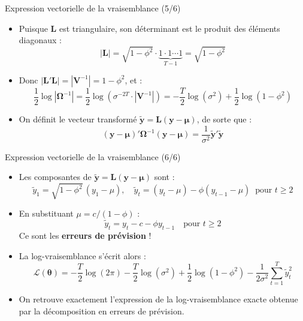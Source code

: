 \documentclass[11pt,aspectratio=169]{beamer}
\begin{document}
\begin{frame}{Expression vectorielle de la vraisemblance (5/6)}

\begin{itemize}

\item Puisque $\mathbf{L}$ est triangulaire, son déterminant est le produit des éléments diagonaux :
  \[
  |\mathbf{L}| = \sqrt{1-\phi^2} \cdot \underbrace{1 \cdot 1 \cdots 1}_{T-1} = \sqrt{1-\phi^2}
  \]\newline

\item Donc $|\mathbf{L}'\mathbf{L}| = |\mathbf{V}^{-1}| = 1 - \phi^2$, et :
  \[
  \frac{1}{2}\log|\bm{\Omega}^{-1}| = \frac{1}{2}\log(\sigma^{-2T} \cdot |\mathbf{V}^{-1}|) = -\frac{T}{2}\log(\sigma^2) + \frac{1}{2}\log(1 - \phi^2)
  \]\newline

\item On définit le vecteur transformé $\tilde{\mathbf{y}} = \mathbf{L}(\mathbf{y} - \bm{\mu})$, de sorte que :
  \[
  (\mathbf{y} - \bm{\mu})'\bm{\Omega}^{-1}(\mathbf{y} - \bm{\mu}) = \frac{1}{\sigma^2}\tilde{\mathbf{y}}'\tilde{\mathbf{y}}
  \]

\end{itemize}

\end{frame}

\begin{frame}{Expression vectorielle de la vraisemblance (6/6)}

\begin{itemize}

\item Les composantes de $\tilde{\mathbf{y}} = \mathbf{L}(\mathbf{y} - \bm{\mu})$ sont :
  \[
  \tilde{y}_1 = \sqrt{1-\phi^2}\,(y_1 - \mu), \quad \tilde{y}_t = (y_t - \mu) - \phi(y_{t-1} - \mu) \;\; \text{pour } t \geq 2
  \]\newline

\item En substituant $\mu = c/(1-\phi)$ :
  \[
  \tilde{y}_t = y_t - c - \phi y_{t-1} \quad \text{pour } t \geq 2
  \]
  Ce sont les \textbf{erreurs de prévision} !\newline

\item La log-vraisemblance s'écrit alors :
  \[
  \boxed{\mathcal{L}(\bm{\theta}) = -\frac{T}{2}\log(2\pi) - \frac{T}{2}\log(\sigma^2) + \frac{1}{2}\log(1-\phi^2) - \frac{1}{2\sigma^2}\sum_{t=1}^{T} \tilde{y}_t^2}
  \]\newline

\item On retrouve exactement l'expression de la log-vraisemblance exacte obtenue par la décomposition en erreurs de prévision.

\end{itemize}

\end{frame}
\end{document}
